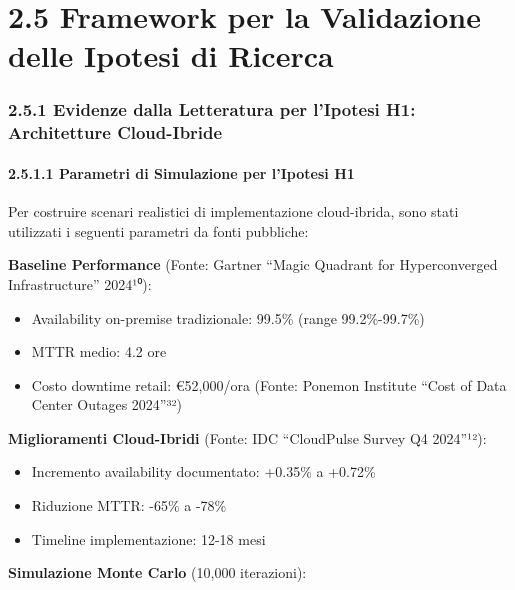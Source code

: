 \documentclass[12pt,a4paper,oneside]{book}
\providecommand{\tightlist}{%
  \setlength{\itemsep}{0pt}\setlength{\parskip}{0pt}
}
\begin{document}
\section{2.5 Framework per la Validazione delle Ipotesi di
Ricerca}\label{framework-per-la-validazione-delle-ipotesi-di-ricerca}

\subsubsection{2.5.1 Evidenze dalla Letteratura per l'Ipotesi H1:
Architetture
Cloud-Ibride}\label{evidenze-dalla-letteratura-per-lipotesi-h1-architetture-cloud-ibride}

\paragraph{2.5.1.1 Parametri di Simulazione per l'Ipotesi
H1}\label{parametri-di-simulazione-per-lipotesi-h1}

Per costruire scenari realistici di implementazione cloud-ibrida, sono
stati utilizzati i seguenti parametri da fonti pubbliche:

\textbf{Baseline Performance} (Fonte: Gartner ``Magic Quadrant for
Hyperconverged Infrastructure'' 2024¹⁰):

\begin{itemize}
\tightlist
\item
  Availability on-premise tradizionale: 99.5\% (range 99.2\%-99.7\%)\\
\item
  MTTR medio: 4.2 ore\\
\item
  Costo downtime retail: €52,000/ora (Fonte: Ponemon Institute ``Cost of
  Data Center Outages 2024''³²)
\end{itemize}

\textbf{Miglioramenti Cloud-Ibridi} (Fonte: IDC ``CloudPulse Survey Q4
2024''¹²):

\begin{itemize}
\tightlist
\item
  Incremento availability documentato: +0.35\% a +0.72\%\\
\item
  Riduzione MTTR: -65\% a -78\%\\
\item
  Timeline implementazione: 12-18 mesi
\end{itemize}

\textbf{Simulazione Monte Carlo} (10,000 iterazioni):
\end{document}
